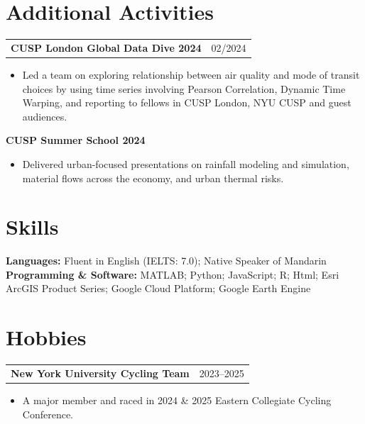 \documentclass[10pt,letterpaper]{article}
\begin{document}
\section*{Additional Activities}
\begin{tabularx}{\textwidth}{@{}Xr@{}}
\textbf{CUSP London Global Data Dive 2024} & 02/2024
\end{tabularx}
\begin{itemize}
  \item Led a team on exploring relationship between air quality and mode of transit choices by using time series involving Pearson Correlation, Dynamic Time Warping, and reporting to fellows in CUSP London, NYU CUSP and guest audiences.
\end{itemize}

\textbf{CUSP Summer School 2024}
\begin{itemize}
  \item Delivered urban-focused presentations on rainfall modeling and simulation, material flows across the economy, and urban thermal risks.
\end{itemize}

\section*{Skills}
\textbf{Languages:} Fluent in English (IELTS: 7.0); Native Speaker of Mandarin\\
\textbf{Programming \& Software:} MATLAB; Python; JavaScript; R; Html; Esri ArcGIS Product Series; Google Cloud Platform; Google Earth Engine

\section*{Hobbies}
\begin{tabularx}{\textwidth}{@{}Xr@{}}
\textbf{New York University Cycling Team} & 2023--2025
\end{tabularx}
\begin{itemize}
  \item A major member and raced in 2024 \& 2025 Eastern Collegiate Cycling Conference.
\end{itemize}
\end{document}
